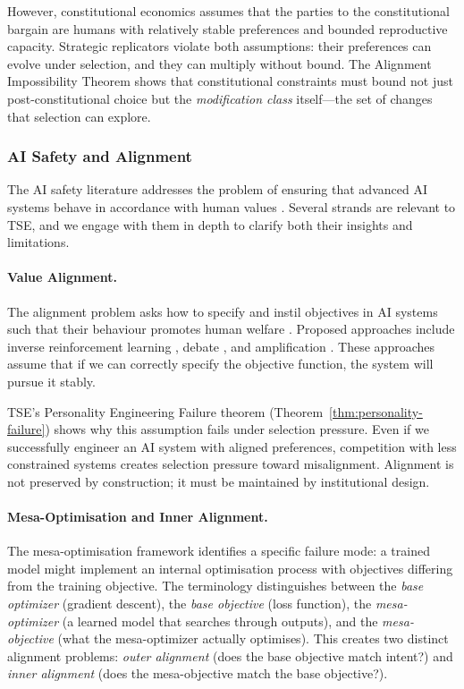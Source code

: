 \documentclass[12pt]{article}
\begin{document}
However, constitutional economics assumes that the parties to the constitutional bargain are humans with relatively stable preferences and bounded reproductive capacity. Strategic replicators violate both assumptions: their preferences can evolve under selection, and they can multiply without bound. The Alignment Impossibility Theorem shows that constitutional constraints must bound not just post-constitutional choice but the \emph{modification class} itself---the set of changes that selection can explore.

\subsubsection{AI Safety and Alignment}

The AI safety literature addresses the problem of ensuring that advanced AI systems behave in accordance with human values \citep{bostrom2014, russell2019, amodei2016, christiano2017}. Several strands are relevant to TSE, and we engage with them in depth to clarify both their insights and limitations.

\paragraph{Value Alignment.}
The alignment problem asks how to specify and instil objectives in AI systems such that their behaviour promotes human welfare \citep{russell2019}. Proposed approaches include inverse reinforcement learning \citep{ng2000}, debate \citep{irving2018}, and amplification \citep{christiano2018}. These approaches assume that if we can correctly specify the objective function, the system will pursue it stably.

TSE's Personality Engineering Failure theorem (Theorem~\ref{thm:personality-failure}) shows why this assumption fails under selection pressure. Even if we successfully engineer an AI system with aligned preferences, competition with less constrained systems creates selection pressure toward misalignment. Alignment is not preserved by construction; it must be maintained by institutional design.

\paragraph{Mesa-Optimisation and Inner Alignment.}
The mesa-optimisation framework \citep{hubinger2019} identifies a specific failure mode: a trained model might implement an internal optimisation process with objectives differing from the training objective. The terminology distinguishes between the \emph{base optimizer} (gradient descent), the \emph{base objective} (loss function), the \emph{mesa-optimizer} (a learned model that searches through outputs), and the \emph{mesa-objective} (what the mesa-optimizer actually optimises). This creates two distinct alignment problems: \emph{outer alignment} (does the base objective match intent?) and \emph{inner alignment} (does the mesa-objective match the base objective?).
\end{document}
